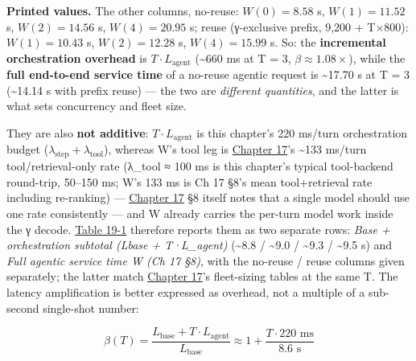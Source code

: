 \textbf{Printed values.} The other columns, no-reuse: \(W(0) = 8.58\) s,
\(W(1) = 11.52\) s, \(W(2) = 14.56\) s, \(W(4) = 20.95\) s; reuse
(γ-exclusive prefix, 9,200 + T×800): \(W(1) = 10.43\) s,
\(W(2) = 12.28\) s, \(W(4) = 15.99\) s. So: the \textbf{incremental
orchestration overhead} is \(T \cdot L_\text{agent}\)
(\textasciitilde660 ms at T = 3, \(\beta \approx 1.08\times\)), while
the \textbf{full end-to-end service time} of a no-reuse agentic request
is \textasciitilde17.70 s at T = 3 (\textasciitilde14.14 s with prefix
reuse) --- the two are \emph{different quantities}, and the latter is
what sets concurrency and fleet size.

They are also \textbf{not additive}: \(T \cdot L_\text{agent}\) is this
chapter's 220 ms/turn orchestration budget
(\(\lambda_\text{step} + \lambda_\text{tool}\)), whereas W's tool leg is
\hyperref[chap:17]{Chapter 17}'s \textasciitilde133 ms/turn tool/retrieval-only rate
(λ\_tool ≈ 100 ms is this chapter's typical tool-backend round-trip,
50--150 ms; W's 133 ms is Ch 17 §8's mean tool+retrieval rate including
re-ranking) --- \hyperref[chap:17]{Chapter 17} §8 itself notes that a single model should
use one rate consistently --- and W already carries the per-turn model
work inside the γ decode. \hyperref[tab:19.1]{Table 19-1} therefore reports them as two
separate rows: \emph{Base + orchestration subtotal (Lbase + T·L\_agent)}
(\textasciitilde8.8 / \textasciitilde9.0 / \textasciitilde9.3 /
\textasciitilde9.5 s) and \emph{Full agentic service time W (Ch 17 §8)},
with the no-reuse / reuse columns given separately; the latter match
\hyperref[chap:17]{Chapter 17}'s fleet-sizing tables at the same T. The latency
amplification is better expressed as overhead, not a multiple of a
sub-second single-shot number:

\[
\beta(T) = \frac{L_\text{base} + T\cdot L_\text{agent}}{L_\text{base}} \approx 1 + \frac{T \cdot 220\text{ ms}}{8.6\text{ s}}
\]

